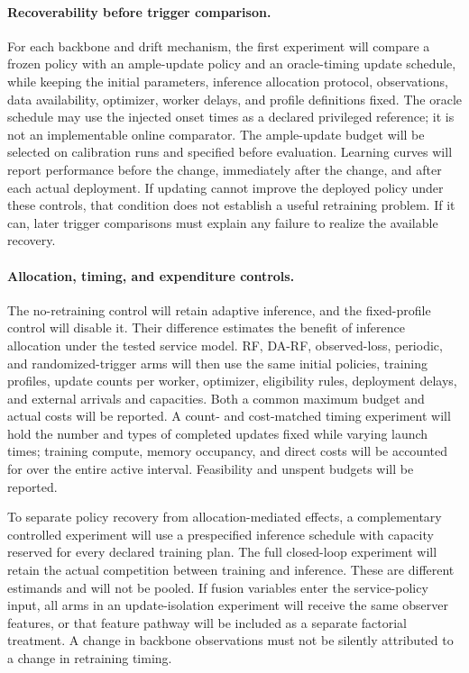\paragraph{Recoverability before trigger comparison.}
For each backbone and drift mechanism, the first experiment will compare a
frozen policy with an ample-update policy and an oracle-timing update schedule,
while keeping the initial parameters, inference allocation protocol, observations,
data availability, optimizer, worker delays, and profile definitions fixed.
The oracle schedule may use the injected onset times as a declared privileged
reference; it is not an implementable online comparator. The ample-update
budget will be selected on calibration runs and specified before evaluation.
Learning curves will report performance before the change, immediately after
the change, and after each actual deployment. If updating cannot improve the
deployed policy under these controls, that condition does not establish a useful
retraining problem. If it can, later trigger comparisons must explain any failure
to realize the available recovery.

\paragraph{Allocation, timing, and expenditure controls.}
The no-retraining control will retain adaptive inference, and the fixed-profile
control will disable it. Their difference estimates the benefit of inference
allocation under the tested service model. RF, DA-RF, observed-loss, periodic,
and randomized-trigger arms will then use the same initial policies, training
profiles, update counts per worker, optimizer, eligibility rules, deployment
delays, and external arrivals and capacities. Both a common maximum budget and
actual costs will be reported. A count- and cost-matched timing experiment will
hold the number and types of completed updates fixed while varying launch times;
training compute, memory occupancy, and direct costs will be accounted for over
the entire active interval. Feasibility and unspent budgets will be reported.

To separate policy recovery from allocation-mediated effects, a complementary
controlled experiment will use a prespecified inference schedule with capacity
reserved for every declared training plan. The full closed-loop experiment will
retain the actual competition between training and inference. These are different
estimands and will not be pooled. If fusion variables enter the service-policy
input, all arms in an update-isolation experiment will receive the same observer
features, or that feature pathway will be included as a separate factorial
treatment. A change in backbone observations must not be silently attributed
to a change in retraining timing.


